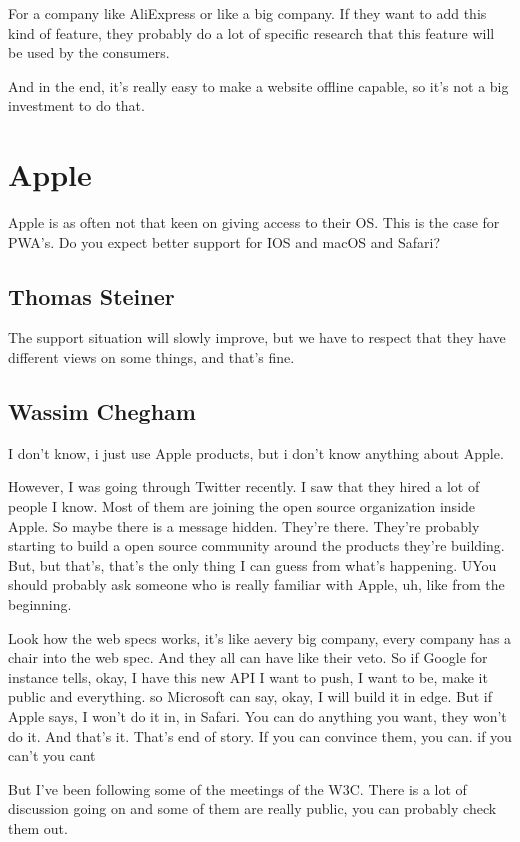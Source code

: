 			For a company like AliExpress or like a big company. If they want to add this kind of feature, they probably do a lot of specific research that this feature will be used by the consumers.
			
			And in the end, it's really easy to make a website offline capable, so it's not a big investment to do that.
		
		
	\section{Apple}
		Apple is as often not that keen on giving access to their OS. This is the case for PWA's. Do you expect better support for IOS and macOS and Safari?
			
		\subsection{Thomas Steiner}
			The support situation will slowly improve, but we have to respect that they have different views on some things, and that’s fine.
		
		\subsection{Wassim Chegham}
			
			I don't know, i just use Apple products, but i don't know anything about Apple.
			
			However, I was going through Twitter recently. I saw that they hired a lot of people I know.   Most of them are joining the open source organization inside Apple. So maybe there is a message hidden. They're there. They're probably starting to build a open source community around the products they're building. But, but that's, that's the only thing I can guess from what's happening. UYou should probably ask someone who is really familiar with Apple, uh, like from the beginning.
			
			Look how the web specs works, it's like aevery big company, every company has  a chair into the web spec. And they all can have like their veto. So if Google for instance tells, okay, I have this new API I want to push, I want to be, make it public and everything. so Microsoft can say, okay, I will build it in edge. But if Apple says, I won't do it in, in Safari. You can do anything you want, they won't do it. And that's it. That's end of story. If you can convince them, you can. if you can't you cant
			
			But I've been following some of the meetings of the W3C. There is a lot of discussion going on and some of them are really public, you can probably check them out. 
			
